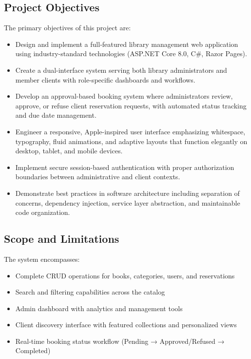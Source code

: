 \documentclass[12pt,a4paper]{article}
\begin{document}
\subsection{Project Objectives}

The primary objectives of this project are:

\begin{itemize}[leftmargin=*]
    \item Design and implement a full-featured library management web application using industry-standard technologies (ASP.NET Core 8.0, C\#, Razor Pages).
    
    \item Create a dual-interface system serving both library administrators and member clients with role-specific dashboards and workflows.
    
    \item Develop an approval-based booking system where administrators review, approve, or refuse client reservation requests, with automated status tracking and due date management.
    
    \item Engineer a responsive, Apple-inspired user interface emphasizing whitespace, typography, fluid animations, and adaptive layouts that function elegantly on desktop, tablet, and mobile devices.
    
    \item Implement secure session-based authentication with proper authorization boundaries between administrative and client contexts.
    
    \item Demonstrate best practices in software architecture including separation of concerns, dependency injection, service layer abstraction, and maintainable code organization.
\end{itemize}

\subsection{Scope and Limitations}

The system encompasses:

\begin{itemize}[leftmargin=*]
    \item Complete CRUD operations for books, categories, users, and reservations
    \item Search and filtering capabilities across the catalog
    \item Admin dashboard with analytics and management tools
    \item Client discovery interface with featured collections and personalized views
    \item Real-time booking status workflow (Pending → Approved/Refused → Completed)
\end{itemize}
\end{document}
